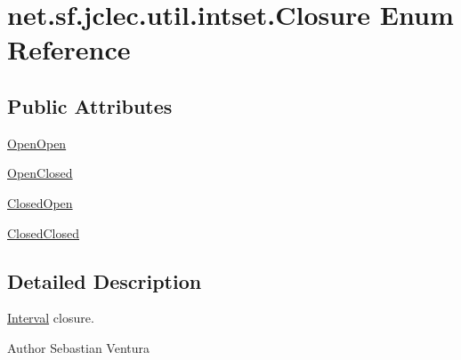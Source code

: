 \hypertarget{enumnet_1_1sf_1_1jclec_1_1util_1_1intset_1_1_closure}{\section{net.\-sf.\-jclec.\-util.\-intset.\-Closure Enum Reference}
\label{enumnet_1_1sf_1_1jclec_1_1util_1_1intset_1_1_closure}
}
\subsection*{Public Attributes}
\begin{DoxyCompactItemize}
\item 
\hyperlink{enumnet_1_1sf_1_1jclec_1_1util_1_1intset_1_1_closure_afb6298f83e6ff0568ba2cd249c34017a}{Open\-Open}
\item 
\hyperlink{enumnet_1_1sf_1_1jclec_1_1util_1_1intset_1_1_closure_a305c17c3c719cc42552d28aa5ed04584}{Open\-Closed}
\item 
\hyperlink{enumnet_1_1sf_1_1jclec_1_1util_1_1intset_1_1_closure_a683ec132350559a9369150fd89356b7d}{Closed\-Open}
\item 
\hyperlink{enumnet_1_1sf_1_1jclec_1_1util_1_1intset_1_1_closure_a7f0eaa6fa09903548a1362c54c901023}{Closed\-Closed}
\end{DoxyCompactItemize}


\subsection{Detailed Description}
\hyperlink{classnet_1_1sf_1_1jclec_1_1util_1_1intset_1_1_interval}{Interval} closure.

\begin{DoxyAuthor}{Author}
Sebastian Ventura 
\end{DoxyAuthor}


